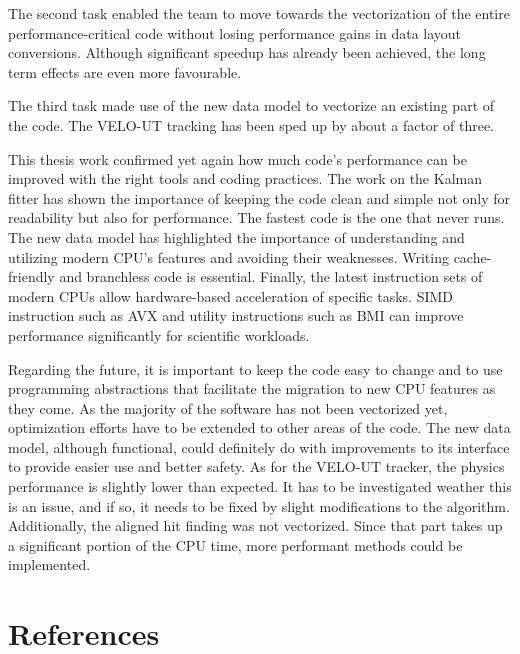 \documentclass[12pt]{article}
\begin{document}
The second task enabled the team to move towards the vectorization of the entire performance-critical code without losing performance gains in data layout conversions. Although significant speedup has already been achieved, the long term effects are even more favourable.

The third task made use of the new data model to vectorize an existing part of the code. The VELO-UT tracking has been sped up by about a factor of three.
\vspace{1pc}

This thesis work confirmed yet again how much code's performance can be improved with the right tools and coding practices. The work on the Kalman fitter has shown the importance of keeping the code clean and simple not only for readability but also for performance. The fastest code is the one that never runs. The new data model has highlighted the importance of understanding and utilizing modern CPU's features and avoiding their weaknesses. Writing cache-friendly and branchless code is essential. Finally, the latest instruction sets of modern CPUs allow hardware-based acceleration of specific tasks. SIMD instruction such as AVX and utility instructions such as BMI can improve performance significantly for scientific workloads.
\vspace{1pc}

Regarding the future, it is important to keep the code easy to change and to use programming abstractions that facilitate the migration to new CPU features as they come. As the majority of the software has not been vectorized yet, optimization efforts have to be extended to other areas of the code. The new data model, although functional, could definitely do with improvements to its interface to provide easier use and better safety.
As for the VELO-UT tracker, the physics performance is slightly lower than expected. It has to be investigated weather this is an issue, and if so, it needs to be fixed by slight modifications to the algorithm. Additionally, the aligned hit finding was not vectorized. Since that part takes up a significant portion of the CPU time, more performant methods could be implemented.



\newpage
\section*{References}
\end{document}
